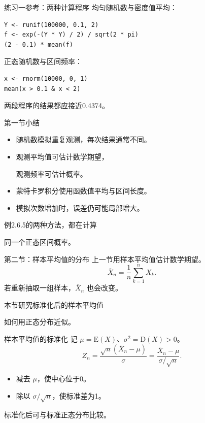 \documentclass[14pt,compress,t,noamsthm,notheorem,table,handout,fontset=none]{ctexbeamer}
\begin{document}
\begin{frame}[fragile]{练习一参考：两种计算程序}
  \small
  均匀随机数与密度值平均：
\begin{lstlisting}
Y <- runif(100000, 0.1, 2)
f <- exp(-(Y * Y) / 2) / sqrt(2 * pi)
(2 - 0.1) * mean(f)
\end{lstlisting}
  正态随机数与区间频率：
\begin{lstlisting}
x <- rnorm(10000, 0, 1)
mean(x > 0.1 & x < 2)
\end{lstlisting}
  两段程序的结果都应接近0.4374。
\end{frame}

\begin{frame}{第一节小结}
  \begin{itemize}
    \item 随机数模拟重复观测，每次结果通常不同。
    \item 观测平均值可估计数学期望，\par
          观测频率可估计概率。
    \item 蒙特卡罗积分使用函数值平均与区间长度。
    \item 模拟次数增加时，误差仍可能局部增大。
  \end{itemize}
  \medskip
  例2.6.5的两种方法，都在计算\par
  同一个正态区间概率。
\end{frame}

\begin{frame}{第二节：样本平均值的分布}
  上一节用样本平均值估计数学期望。
  \[
    \overline{X}_n=\frac{1}{n}\sum_{k=1}^n X_k.
  \]
  若重新抽取一组样本，$\overline{X}_n$ 也会改变。\par\medskip
  本节研究标准化后的样本平均值\par
  如何用正态分布近似。
\end{frame}

\begin{frame}{样本平均值的标准化}
  记 $\mu=\mathrm{E}(X)$、$\sigma^2=\mathrm{D}(X)>0$。
  \[
    Z_n=\frac{\sqrt{n}(\overline{X}_n-\mu)}{\sigma}
       =\frac{\overline{X}_n-\mu}{\sigma/\sqrt{n}}.
  \]
  \begin{itemize}
    \item 减去 $\mu$，使中心位于0。
    \item 除以 $\sigma/\sqrt{n}$，使标准差为1。
  \end{itemize}
  标准化后可与标准正态分布比较。
\end{frame}
\end{document}
